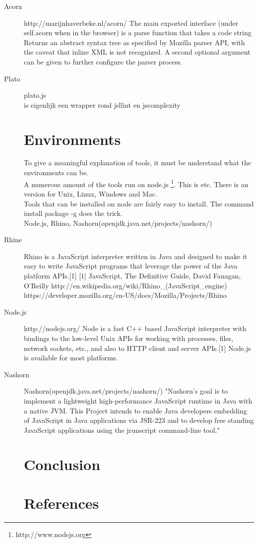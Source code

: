\documentclass{article}
\begin{document}
\begin{description}
\item[Acorn]http://marijnhaverbeke.nl/acorn/
The main exported interface (under self.acorn when in the browser) is a parse function that takes a code string\\
Returns an abstract syntax tree as specified by Mozilla parser API, with the caveat that inline XML is not recognized.
A second optional argument can be given to further configure the parser process.

\item[Plato]plato.js\\
is eigenlijk een wrapper rond jsllint en jscomplexity


\section{Environments}
To give a meaningful explanation of tools, it must be understand what the environments can be.\\
A numerous amount of the tools run on node.js \footnote{http://www.nodejs.org}. This is etc.
There is an version for Unix, Linux, Windows and Mac.\\
Tools that can be installed on node are fairly easy to install. The command install package -g does the trick.\\
Node.js, Rhino, Nashorn(openjdk.java.net/projects/nashorn/)

\item[Rhine]Rhino is a JavaScript interpreter written in Java and designed to make it easy to write JavaScript programs that leverage the power of the Java platform APIs.[1]
[1] JavaScript, The Definitive Guide, David Fanagan, O'Reilly\newline
http://en.wikipedia.org/wiki/Rhino\_(JavaScript\_engine)
https://developer.mozilla.org/en-US/docs/Mozilla/Projects/Rhino

\item[Node.js]
http://nodejs.org/
Node is a fast C++ based JavaScript interpreter with bindings to the low-level Unix APIs for working with processes, files, network sockets, etc., and also to HTTP client and server APIs.[1]
Node.js is available for most platforms.

\item[Nashorn]Nashorn(openjdk.java.net/projects/nashorn/)
"Nashorn's goal is to implement a lightweight high-performance JavaScript runtime in Java with a native JVM. This Project intends to enable Java developers embedding of JavaScript in Java applications via JSR-223 and to develop free standing JavaScript applications using the jrunscript command-line tool."

\section{Conclusion}

\section{References}

\end{description}
\end{document}

